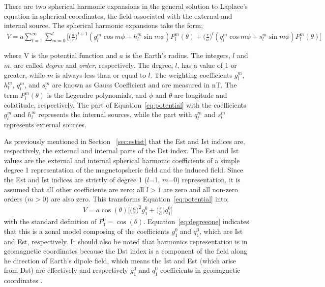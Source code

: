 \documentclass[12pt]{report} %
\begin{document}
There are two spherical harmonic expansions in the general solution to Laplace's equation in spherical coordinates, the field associated with the external and internal source. The spherical harmonic expansions take the form;
\begingroup\makeatletter\def\f@size{9}\check@mathfonts
\def\maketag@@@#1{\hbox{\m@th\large\normalfont#1}}
\begin{align}
V=a \sum_{l=1}^\infty \sum_{m=0}^l  \bigg[ \bigg( \frac{a}{r} \bigg)^{l+1} (g_l^m \cos m\phi + h_l^m \sin m\phi) P_l^m(\theta) \label{eq:potential} + \bigg( \frac{r}{a} \bigg)^l (q_l^m \cos m\phi + s_l^m \sin m\phi) P_l^m(\theta) \bigg] 
\end{align} \endgroup

\noindent where V is the potential function and $a$ is the Earth's radius. The integers, $l$ and $m$, are called \textit{degree} and \textit{order}, respectively. The degree, $l$, has a value of 1 or greater, while $m$ is always less than or equal to $l$. The weighting coefficients $g_l^m$, $h_l^m$, $q_l^m$, and $s_l^m$ are known as Gauss Coefficient \citep{campbell03} and are measured in nT. The term $P_l^m (\theta)$ is the Legendre polynomials, and $\phi$ and $\theta$ are longitude and colatitude, respectively. The part of Equation~\ref{eq:potential} with the coefficients $g_l^m$ and $h_l^m$ represents the internal sources, while the part with $q_l^m$ and $s_l^m$ represents external sources. 

As previously mentioned in Section ~\ref{sec:estist} that the Est and Ist indices are, respectively, the external and internal parts of the Dst index. The Est and Ist values are the external and internal spherical harmonic coefficients of a simple degree 1 representation of the magnetopsheric field and the induced field. Since the Est and Ist indices are strictly of degree 1 ($l$=1, $m$=0) representation, it is assumed that all other coefficients are zero; all $l >1$ are zero and all non-zero orders ($m>0$) are also zero. This transforms Equation~\ref{eq:potential} into;
\begin{align}
V=a \cos(\theta) \bigg[ \bigg( \frac{a}{r} \bigg)^{2} g_1^0 + \bigg(\frac{r}{a} \bigg) q_1^0 \bigg]  \label{eq:degreeone} 
\end{align} 
\noindent with the standard definition of $P_1^0 = \cos(\theta)$. Equation~\ref{eq:degreeone} indicates that this is a zonal model composing of the coefficients $g_1^0 $ and $q_1^0$, which are Ist and Est, respectively. It should also be noted that harmonics representation is in geomagnetic coordinates because the Dst index is a component of the field along he direction of Earth's dipole field, which means the Ist and Est (which arise from Dst) are effectively and respectively $g_1^0$ and $q_1^0$ coefficients in geomagnetic coordinates .  
\end{document}
